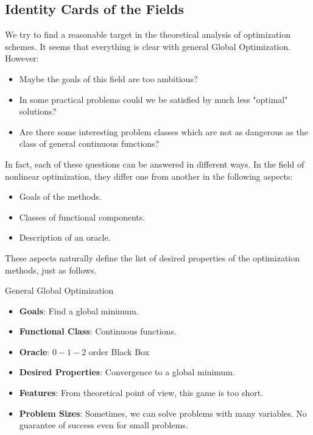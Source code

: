 \subsection{Identity Cards of the Fields}\label{subsec:Identity_Cards_of_the_Fields}

We try to find a reasonable target in the theoretical analysis of optimization schemes. It seems that everything is clear with general Global Optimization. However:
\begin{itemize}
    \item Maybe the goals of this field are too ambitious?
    \item In some practical problems could we be satisfied by much less "optimal" solutions?
    \item Are there some interesting problem classes which are not as dangerous as the class of general continuous functions?
\end{itemize}

In fact, each of these questions can be answered in different ways. In the field of nonlinear optimization, they differ one from another in the following aspects:
\begin{itemize}
    \item Goals of the methods.
    \item Classes of functional components.
    \item Description of an oracle.
\end{itemize}

These aspects naturally define the list of desired properties of the optimization methods, just as follows.

\begin{colorboxnote}{General Global Optimization}
    \begin{itemize}
        \item \textbf{Goals}: Find a global minimum.
        \item \textbf{Functional Class}: Continuous functions.
        \item \textbf{Oracle}: \(0-1-2\) order Black Box
        \item \textbf{Desired Properties}: Convergence to a global minimum.
        \item \textbf{Features}: From theoretical point of view, this game is too short.
        \item \textbf{Problem Sizes}: Sometimes, we can solve problems with many variables. No guarantee of success even for small problems.
    \end{itemize}
\end{colorboxnote}

